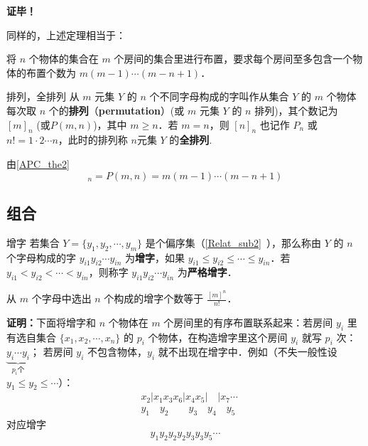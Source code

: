 \textbf{证毕！}

同样的，上述定理相当于：
\begin{theorem}{}\label{APC_the2}
将 $n$ 个物体的集合在 $m$ 个房间的集合里进行布置，要求每个房间至多包含一个物体的布置个数为 $m(m-1)\cdots(m-n+1)$．
\end{theorem}

\begin{definition}{排列，全排列}\label{APC_def3}
从 $m$ 元集 $Y$ 的 $n$ 个不同字母构成的字叫作从集合 $Y$ 的 $m$ 个物体每次取 $n$ 个的\textbf{排列}（\textbf{permutation}）(或 $m$ 元集 $Y$ 的 $n$ 排列)，其个数记为 $[m]_n$ (或$P(m,n)$)，其中 $m\geq n$．若 $m=n$，则 $[n]_n$ 也记作 $P_n$ 或 $n!=1\cdot2\cdots n$，此时的排列称 $n$元集 $Y$ 的\textbf{全排列}.
\end{definition}
由\autoref{APC_the2} 
\begin{equation}
[m]_n=P(m,n)=m(m-1)\cdots(m-n+1)
\end{equation}

\subsection{组合}

\begin{definition}{增字}
若集合 $Y=\{y_1,y_2,\cdots,y_m\}$ 是个偏序集（\autoref{Relat_sub2}~），那么称由 $Y$ 的 $n$ 个字母构成的字 $y_{i1}y_{i2}\cdots y_{in}$ 为\textbf{增字}，如果 $y_{i1}\leq y_{i2}\leq\cdots\leq y_{in}$．若 $y_{i1}<y_{i2}<\cdots<y_{in}$，则称字 $y_{i1}y_{i2}\cdots y_{in}$ 为\textbf{严格增字}．
\end{definition}
\begin{theorem}{}\label{APC_the4}
从 $m$ 个字母中选出 $n$ 个构成的增字个数等于 $\frac{[m]^n}{n!}$．
\end{theorem}
\textbf{证明：}下面将增字和 $n$ 个物体在 $m$ 个房间里的有序布置联系起来：若房间 $y_i$ 里有选自集合 $\{x_1,x_2,\cdots,x_n\}$ 的 $p_i$ 个物体，在构造增字里这个房间 $y_i$ 就写 $p_i$ 次：$\underbrace{y_i\cdots y_i}_{p_i\text{个}}$；
若房间 $y_i$ 不包含物体，$y_i$ 就不出现在增字中．例如（不失一般性设 $y_1\leq y_2\leq\cdots$）：
\begin{equation}
\begin{aligned}
&x_2| x_1 x_3 x_6|x_4 x_5|\quad|x_7\cdots\\
&y_1\quad y_2\qquad y_3\quad y_4\quad y_5
\end{aligned}
\end{equation}
对应增字
\begin{equation}
y_1y_2y_2y_2y_3y_3y_5\cdots
\end{equation}

